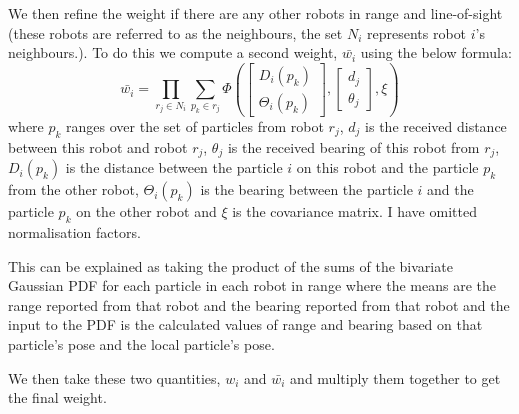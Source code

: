 \documentclass[10pt,a4paper]{article}
\begin{document}
We then refine the weight if there are any other robots in range and line-of-sight (these robots are referred to as the neighbours, the set $N_i$ represents robot $i$'s neighbours.). To do this we compute a second weight, $\bar{w_i}$ using the below formula:
\[
	\bar{w_i} = \prod_{r_j \in N_i}\sum_{p_k \in r_j}\Phi\left(
	\begin{bmatrix}
		D_i(p_k)\\
		\Theta_i(p_k)
	\end{bmatrix},
	\begin{bmatrix}
		d_j\\
		\theta_j
	\end{bmatrix},
	\xi
	\right)
\]
where $p_k$ ranges over the set of particles from robot $r_j$, $d_j$ is the received distance between this robot and robot $r_j$, $\theta_j$ is the received bearing of this robot from $r_j$, $D_i(p_k)$ is the distance between the particle $i$ on this robot and the particle $p_k$ from the other robot, $\Theta_i(p_k)$ is the bearing between the particle $i$ and the particle $p_k$ on the other robot and $\xi$ is the covariance matrix. I have omitted normalisation factors.

This can be explained as taking the product of the sums of the bivariate Gaussian PDF for each particle in each robot in range where the means are the range reported from that robot and the bearing reported from that robot and the input to the PDF is the calculated values of range and bearing based on that particle's pose and the local particle's pose.

We then take these two quantities, $w_i$ and $\bar{w_i}$ and multiply them together to get the final weight.
\end{document}
